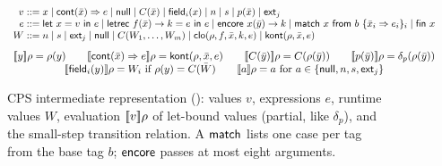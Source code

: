 \begin{figure}[!tbp]
\centering\small
\[
\resizebox{\ifdim\width>\linewidth\linewidth\else\width\fi}{!}{$\displaystyle
\begin{array}{r@{\;}c@{\;}l}
v & ::= & x \mid \kw{cont}(\bar{x}) \Rightarrow e \mid \nullk \mid C(\bar{x}) \mid \kw{field}_i(x) \mid n \mid s \mid p(\bar{x}) \mid \ext{j} \\
e & ::= & \kw{let}\ x = v\ \kw{in}\ e \mid \kw{letrec}\ f(\bar{x}) \to k = e\ \kw{in}\ e
          \mid \enc\ x(\bar{y}) \to k \mid \kw{match}\ x\ \kw{from}\ b\ \{\bar{x}_i \Rightarrow e_i\}_{i} \mid \kw{fin}\ x \\
W & ::= & n \mid s \mid \ext{j} \mid \nullk \mid C(W_1, \dots, W_m) \mid \clo(\rho, f, \bar{x}, k, e) \mid \kont(\rho, \bar{x}, e)
\end{array}
$}
\]
\vspace{-0.3em}
\[
\resizebox{\ifdim\width>\linewidth\linewidth\else\width\fi}{!}{$\displaystyle
\begin{array}{c}
\sem{y}\rho = \rho(y) \qquad
\sem{\kw{cont}(\bar{x}) \Rightarrow e}\rho = \kont(\rho, \bar{x}, e) \qquad
\sem{C(\bar{y})}\rho = C(\rho(\bar{y})) \qquad
\sem{p(\bar{y})}\rho = \delta_p(\rho(\bar{y})) \\
\sem{\kw{field}_i(y)}\rho = W_i \ \text{if}\ \rho(y) = C(\bar{W}) \qquad
\sem{a}\rho = a \ \text{for}\ a \in \{\nullk, n, s, \ext{j}\}
\end{array}
$}
\]
\vspace{-0.3em}
\caption{CPS intermediate representation (): values $v$, expressions $e$, runtime values $W$, evaluation $[\![v]\!]\rho$ of let-bound values (partial, like $\delta_p$), and the small-step transition relation. A $\mathsf{match}$ lists one case per tag from the base tag $b$; $\mathsf{encore}$ passes at most eight arguments.}
\label{fig:cps}
\end{figure}

